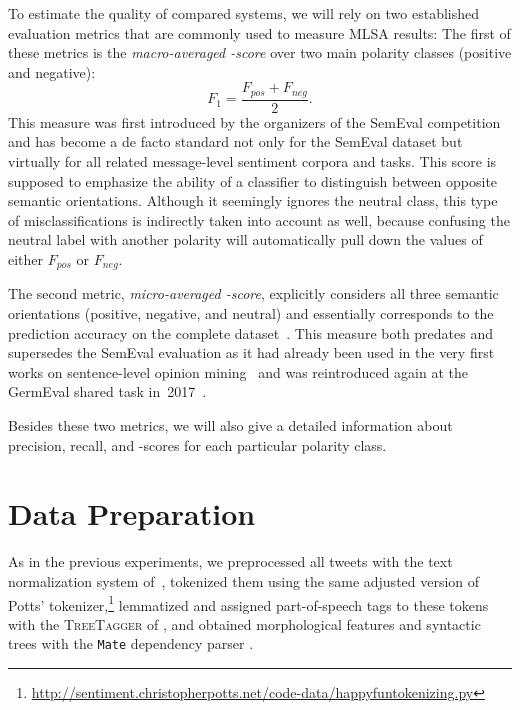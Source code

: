 To estimate the quality of compared systems, we will rely on two
established evaluation metrics that are commonly used to measure MLSA
results: The first of these metrics is the \emph{macro-averaged
  \F-score} over two main polarity classes (positive and negative):
\begin{equation*}
  F_1 = \frac{F_{pos} + F_{neg}}{2}.
\end{equation*}
This measure was first introduced by the organizers of the SemEval
competition~\cite{Nakov:13,Rosenthal:14,Rosenthal:15} and has become a
de facto standard not only for the SemEval dataset but virtually for
all related message-level sentiment corpora and tasks.  This score is
supposed to emphasize the ability of a classifier to distinguish
between opposite semantic orientations.  Although it seemingly ignores
the neutral class, this type of misclassifications is indirectly taken
into account as well, because confusing the neutral label with another
polarity will automatically pull down the values of either $F_{pos}$
or $F_{neg}$.

The second metric, \emph{micro-averaged \F-score}, explicitly
considers all three semantic orientations (positive, negative, and
neutral) and essentially corresponds to the prediction accuracy on the
complete dataset~\cite[see][p.~577]{Manning:99}.  This measure both
predates and supersedes the SemEval evaluation as it had already been
used in the very first works on sentence-level opinion
mining~\cite{Wiebe:99,Das:01,Read:05,Kennedy:06,Go:09} and was
reintroduced again at the GermEval shared task
in~2017~\cite{Wojatzki:17}.

Besides these two metrics, we will also give a detailed information
about precision, recall, and \F-scores for each particular polarity
class.

\section{Data Preparation}\label{sec:cgsa:data}

As in the previous experiments, we preprocessed all tweets with the
text normalization system of~\citet{Sidarenka:13}, tokenized them
using the same adjusted version of Potts'
tokenizer,\footnote{\url{http://sentiment.christopherpotts.net/code-data/happyfuntokenizing.py}}
lemmatized and assigned part-of-speech tags to these tokens with the
\textsc{TreeTagger} of \citet{Schmid:95}, and obtained morphological
features and syntactic trees with the \texttt{Mate} dependency parser
\cite{Bohnet:13}.

